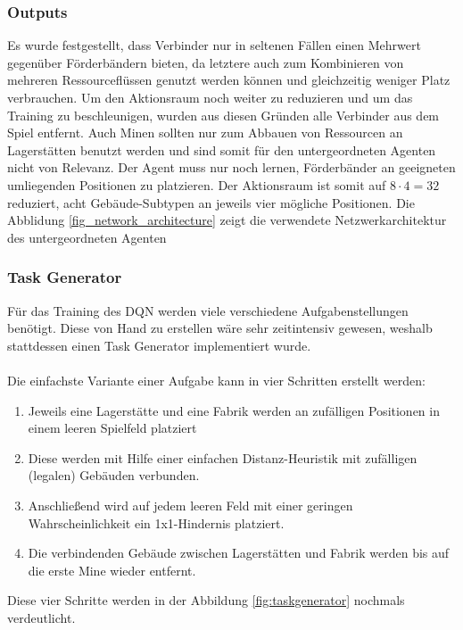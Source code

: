 \subsubsection*{Outputs}
Es wurde festgestellt, dass Verbinder nur in seltenen Fällen einen Mehrwert gegenüber Förderbändern bieten, da letztere auch zum Kombinieren von mehreren Ressourceflüssen genutzt werden können und gleichzeitig weniger Platz verbrauchen. 
Um den Aktionsraum noch weiter zu reduzieren und um das Training zu beschleunigen, wurden aus diesen Gründen alle Verbinder aus dem Spiel entfernt. Auch Minen sollten nur zum Abbauen von Ressourcen an Lagerstätten benutzt werden und sind somit für den untergeordneten Agenten nicht von Relevanz. Der Agent muss nur noch lernen, Förderbänder an geeigneten umliegenden Positionen zu platzieren. Der Aktionsraum ist somit auf $8 \cdot 4 = 32$ reduziert, acht Gebäude-Subtypen an jeweils vier mögliche Positionen. Die Abblidung \ref{fig_network_architecture} zeigt die verwendete Netzwerkarchitektur des untergeordneten Agenten

\subsubsection*{Task Generator}
Für das Training des DQN werden viele verschiedene Aufgabenstellungen benötigt. Diese von Hand zu erstellen wäre sehr zeitintensiv gewesen, weshalb stattdessen einen Task Generator implementiert wurde.
\\\\
Die einfachste Variante einer Aufgabe kann in vier Schritten erstellt werden:
\begin{enumerate}
	\item Jeweils eine Lagerstätte und eine Fabrik werden an zufälligen Positionen in einem leeren Spielfeld platziert
	\item Diese werden mit Hilfe einer einfachen Distanz-Heuristik mit zufälligen (legalen) Gebäuden verbunden. 
	\item Anschließend wird auf jedem leeren Feld mit einer geringen Wahrscheinlichkeit ein 1x1-Hindernis platziert. 
	\item Die verbindenden Gebäude zwischen Lagerstätten und Fabrik werden bis auf die erste Mine wieder entfernt. 
\end{enumerate}

Diese vier Schritte werden in der Abbildung \ref{fig:taskgenerator} nochmals verdeutlicht.

